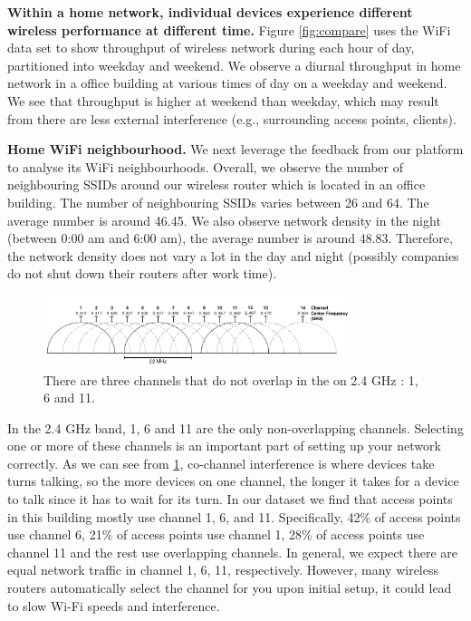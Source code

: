 \textbf{Within a home network, individual devices experience different wireless performance at different time.} Figure \ref{fig:compare} uses the WiFi data set to show throughput of wireless network during each hour of day, partitioned into weekday and weekend. We observe a diurnal throughput in home network in a office building at various times of day on a weekday and weekend. We see that throughput is higher at weekend than weekday, which may result from there are less external interference (e.g., surrounding access points, clients).

\textbf{Home WiFi neighbourhood.} We next leverage the feedback from our platform to analyse its WiFi neighbourhoods. Overall, we observe the number of neighbouring SSIDs around our wireless router which is located in an office building. The number of neighbouring SSIDs varies between 26 and 64. The average number is around 46.45. We also observe network density in the night (between 0:00 am and 6:00 am), the average number is around 48.83. Therefore, the network density does not vary a lot in the day and night (possibly companies do not shut down their routers after work time).

\begin{figure}
\centering
\includegraphics[width=0.8\textwidth]{figure/2GHz_WiFi_channels.png}
\caption{There are three channels that do not overlap in the on 2.4 GHz : 1, 6 and 11.} 
\label{fig:channels}
\end{figure}

In the 2.4 GHz band, 1, 6 and 11 are the only non-overlapping channels. Selecting one or more of these channels is an important part of setting up your network correctly. As we can see from \ref{fig:channels}, co-channel interference is where devices take turns talking, so the more devices on one channel, the longer it takes for a device to talk since it has to wait for its turn. In our dataset we find that access points in this building mostly use channel 1, 6, and 11. Specifically, 42\% of access points use channel 6, 21\% of access points use channel 1, 28\% of access points use channel 11 and the rest use overlapping channels. In general, we expect there are equal network traffic in channel 1, 6, 11, respectively. However,  many wireless routers automatically select the channel for you upon initial setup, it could lead to slow Wi-Fi speeds and interference. 